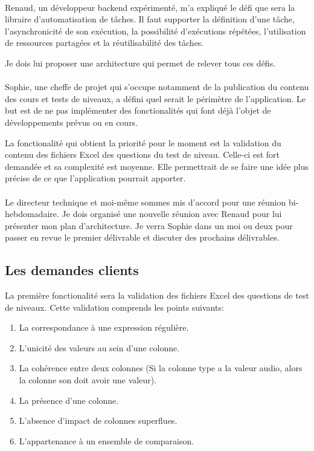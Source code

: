     \paragraph{}
    Renaud, un développeur backend expérimenté, m'a expliqué le défi que sera la libraire d'automatisation de tâches.
    Il faut supporter la définition d'une tâche, l'asynchronicité de son exécution, la possibilité d'exécutions répétées,
    l'utilisation de ressources partagées et la réutilisabilité des tâches.

    Je dois lui proposer une architecture qui permet de relever tous ces défis.

    \paragraph{}
    Sophie, une cheffe de projet qui s'occupe notamment de la publication du contenu des cours et tests de niveaux,
    a défini quel serait le périmètre de l'application.
    Le but est de ne pas implémenter des fonctionalités qui font déjà l'objet de développements prévus ou en cours.

    La fonctionalité qui obtient la priorité pour le moment est la validation du contenu des fichiers Excel des questions du test de niveau.
    Celle-ci est fort demandée et sa complexité est moyenne.
    Elle permettrait de se faire une idée plus précise de ce que l'application pourrait apporter.

    \paragraph{}
    Le directeur technique et moi-même sommes mis d'accord pour une réunion bi-hebdomadaire.
    Je dois organisé une nouvelle réunion avec Renaud pour lui présenter mon plan d'architecture.
    Je verra Sophie dans un moi ou deux pour passer en revue le premier délivrable et discuter des prochains délivrables.

\subsection{Les demandes clients}
\label{subsec:customer-requests}

    La première fonctionalité sera la validation des fichiers Excel des questions de test de niveaux.
    Cette validation comprends les points suivants:
    \begin{enumerate}
        \item La correspondance à une expression régulière.
        \item L'unicité des valeurs au sein d'une colonne.
        \item La cohérence entre deux colonnes (Si la colonne type a la valeur audio, alors la colonne son doit avoir une valeur).
        \item La présence d'une colonne.
        \item L'absence d'impact de colonnes superflues.
        \item L'appartenance à un ensemble de comparaison.
    \end{enumerate}

